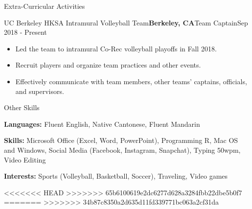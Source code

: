 \documentclass{resume}
\begin{document}

\newpage


\begin{rSection}{Extra-Curricular Activities} 

\begin{rSubsection}{UC Berkeley HKSA Intramural Volleyball Team}{\bf {Berkeley, CA}}{Team Captain}{Sep 2018 - Present}
\begin{itemize}
    \item Led the team to intramural Co-Rec volleyball playoffs in Fall 2018.
    \item Recruit players and organize team practices and other events.
    \item Effectively communicate with team members, other teams’ captains, officials, and supervisors.
\end{itemize}
\end{rSubsection}

\end{rSection}


\begin{rSection}{Other Skills}

{\bf Languages:} Fluent English, Native Cantonese, Fluent Mandarin %
\item {\bf Skills:} Microsoft Office (Excel, Word, PowerPoint), Programming R, Mac OS and Windows, Social Media (Facebook, Instagram, Snapchat), Typing 50wpm, Video Editing %
\item {\bf Interests:} Sports (Volleyball, Basketball, Soccer), Traveling, Video games %

\end{rSection}
<<<<<<< HEAD
>>>>>>> 65b6100619e2dc6277d628a3284fbb22dbe5b0f7
=======
>>>>>>> 34b87c8350a2d635d11fd339771bc063a2cf31da
\end{document}
